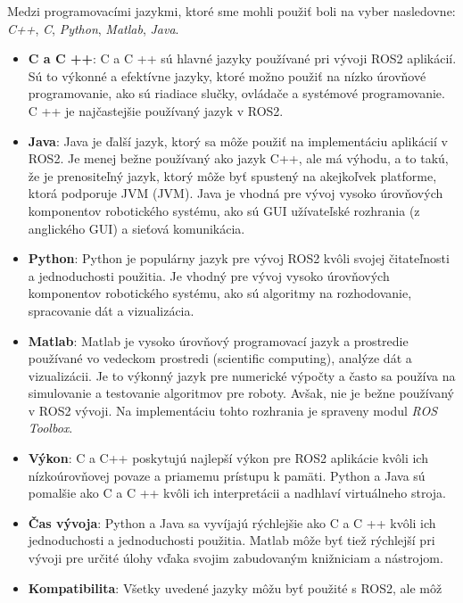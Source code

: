 Medzi programovacími jazykmi, ktoré sme mohli použiť boli na vyber nasledovne: \textit{C++}, \textit{C}, \textit{Python},
\textit{Matlab}, \textit{Java}.

\begin{itemize}
	\item \textbf{C a C ++}: C a C ++ sú hlavné jazyky používané pri vývoji ROS2 aplikácií. Sú to výkonné a efektívne jazyky,
		ktoré možno použiť na nízko úrovňové programovanie, ako sú riadiace slučky, ovládače a systémové programovanie.
		C ++ je najčastejšie používaný jazyk v ROS2.

	\item \textbf{Java}: Java je ďalší jazyk, ktorý sa môže použiť na implementáciu aplikácií v ROS2. Je menej bežne
		používaný ako jazyk C++, ale má výhodu, a to takú, že je prenositeľný jazyk, ktorý môže byť spustený na akejkoľvek
		platforme, ktorá podporuje JVM (\acrlong{JVM}). Java je vhodná pre vývoj vysoko úrovňových komponentov robotického
		systému, ako sú GUI užívateľské rozhrania (z anglického \acrlong{GUI}) a sieťová komunikácia.

	\item \textbf{Python}: Python je populárny jazyk pre vývoj ROS2 kvôli svojej čitateľnosti a jednoduchosti použitia.
		Je vhodný pre vývoj vysoko úrovňových komponentov robotického systému, ako sú algoritmy na rozhodovanie,
		spracovanie dát a vizualizácia.

	\item \textbf{Matlab}: Matlab je vysoko úrovňový programovací jazyk a prostredie používané vo vedeckom prostredi
		(scientific computing), analýze dát a vizualizácii. Je to výkonný jazyk pre numerické výpočty a často sa používa
		na simulovanie a testovanie algoritmov pre roboty. Avšak, nie je bežne používaný v ROS2 vývoji. Na implementáciu
		tohto rozhrania je spraveny modul \textit{ROS Toolbox}.

	\item \textbf{Výkon}: C a C++ poskytujú najlepší výkon pre ROS2 aplikácie kvôli ich nízkoúrovňovej povaze a priamemu
		prístupu k pamäti. Python a Java sú pomalšie ako C a C ++ kvôli ich interpretácii a nadhlaví virtuálneho stroja.

	\item \textbf{Čas vývoja}: Python a Java sa vyvíjajú rýchlejšie ako C a C ++ kvôli ich jednoduchosti a jednoduchosti
		použitia. Matlab môže byť tiež rýchlejší pri vývoji pre určité úlohy vďaka svojim zabudovaným knižniciam a nástrojom.

	\item \textbf{Kompatibilita}: Všetky uvedené jazyky môžu byť použité s ROS2, ale môž
\end{itemize}

